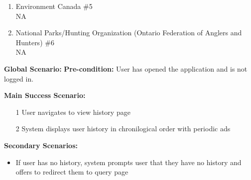 \documentclass[]{article}
\begin{document}
\begin{enumerate}[{\bf BE1.}]
\begin{enumerate}[{\bf VP1.}]
            \item Environment Canada \#5 \\
                \newline NA
    
            \item National Parks/Hunting Organization (Ontario Federation of Anglers and Hunters) \#6 \\
                \newline NA
        \end{enumerate}
        \textbf{Global Scenario:}
        \noindent \textbf{Pre-condition:} User has opened the application and is not logged in.
    
            \noindent \textbf{Main Success Scenario:}
            \begin{enumerate}
                \item[1] User navigates to view history page
                \item[2] System displays user history in chronilogical order with periodic ads
            \end{enumerate}
    
            \noindent \textbf{Secondary Scenarios:}
            \begin{itemize}
                \item If user has no history, system prompts user that they have no history and offers to redirect them to query page
            \end{itemize}
    


\end{enumerate}
\end{document}
